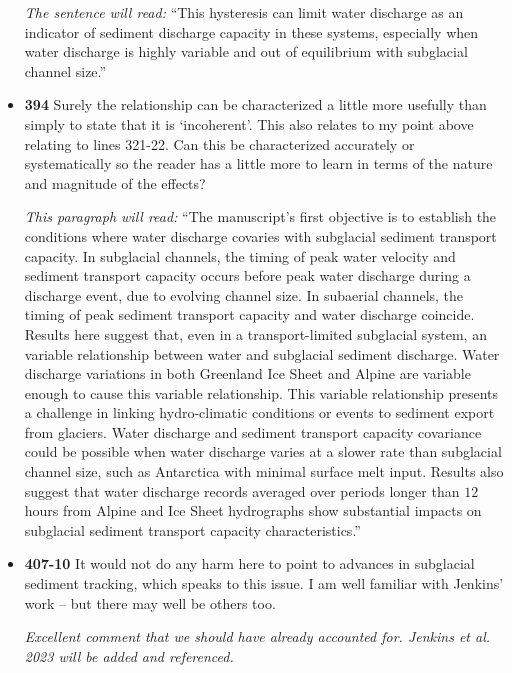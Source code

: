\documentclass[11pt]{article}
\begin{document}
\begin{itemize}
  \textit{The sentence will read:} ``This hysteresis can limit water discharge as an indicator of sediment discharge capacity in these systems, especially when water discharge is highly variable and out of equilibrium with subglacial channel size.''

\item \textbf{394} Surely the relationship can be characterized a little more usefully than
  simply to state that it is ‘incoherent’. This also relates to my point above
  relating to lines 321-22. Can this be characterized accurately or
  systematically so the reader has a little more to learn in terms of the nature
  and magnitude of the effects?

\textit{This paragraph will read:} ``The manuscript's first objective is to establish the conditions where water discharge covaries with subglacial sediment transport capacity.
In subglacial channels, the timing of peak water velocity and sediment transport capacity occurs before peak water discharge during a discharge event, due to evolving channel size.
In subaerial channels, the timing of peak sediment transport capacity and water discharge coincide.
Results here suggest that, even in a transport-limited subglacial system, an variable relationship between water and subglacial sediment discharge.
Water discharge variations in both Greenland Ice Sheet and Alpine are variable enough to cause this variable relationship.
This variable relationship presents a challenge in linking hydro-climatic conditions or events to sediment export from glaciers.
Water discharge and sediment transport capacity covariance could be possible when water discharge varies at a slower rate than subglacial channel size, such as Antarctica with minimal surface melt input.
Results also suggest that water discharge records averaged over periods longer than $12$ hours from Alpine and Ice Sheet hydrographs show substantial impacts on subglacial sediment transport capacity characteristics.''

  
\item \textbf{407-10} It would not do any harm here to point to advances in subglacial sediment
  tracking, which speaks to this issue. I am well familiar with Jenkins’ work –
  but there may well be others too.

  \textit{Excellent comment that we should have already accounted for. Jenkins et al. 2023 will be added and referenced.}
  
\end{itemize}

 

\end{document}
